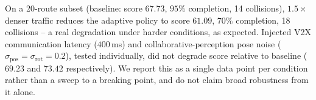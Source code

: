 On a 20-route subset (baseline: score $67.73$, $95\%$ completion, 14 collisions), $1.5\times$ denser traffic reduces the adaptive policy to score $61.09$, $70\%$ completion, 18 collisions -- a real degradation under harder conditions, as expected. Injected V2X communication latency ($400$\,ms) and collaborative-perception pose noise ($\sigma_{\text{pos}}{=}\sigma_{\text{rot}}{=}0.2$), tested individually, did not degrade score relative to baseline ($69.23$ and $73.42$ respectively). We report this as a single data point per condition rather than a sweep to a breaking point, and do not claim broad robustness from it alone.

\FloatBarrier